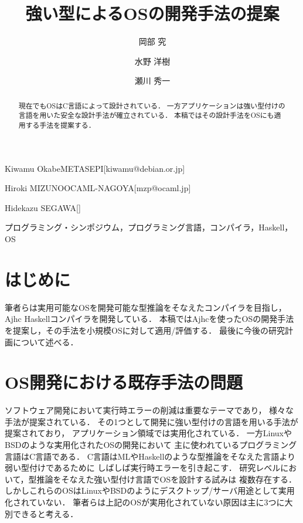 \documentclass[submit,techreq,noauthor]{ipsj}
\begin{document}
\title{強い型によるOSの開発手法の提案}


\author{岡部 究}{Kiwamu Okabe}{METASEPI}[kiwamu@debian.or.jp]
\author{水野 洋樹}{Hiroki MIZUNO}{OCAML-NAGOYA}[mzp@ocaml.jp]
\author{瀬川 秀一}{Hidekazu SEGAWA}{}[]

\begin{abstract}
現在でもOSはC言語によって設計されている．
一方アプリケーションは強い型付けの言語を用いた安全な設計手法が確立されている．
本稿ではその設計手法をOSにも適用する手法を提案する．
\end{abstract}

\begin{jkeyword}
プログラミング・シンポジウム，プログラミング言語，コンパイラ，Haskell，OS
\end{jkeyword}

\maketitle

\section{はじめに}

筆者らは実用可能なOSを開発可能な型推論をそなえたコンパイラを目指し，
Ajhc Haskellコンパイラ\cite{ajhc}を開発している．
本稿ではAjhcを使ったOSの開発手法を提案し，その手法を小規模OSに対して適用/評価する．
最後に今後の研究計画について述べる．

\section{OS開発における既存手法の問題}
\label{sec:problems}

ソフトウェア開発において実行時エラーの削減は重要なテーマであり，
様々な手法が提案されている．
その1つとして開発に強い型付けの言語を用いる手法が提案されており，
アプリケーション領域では実用化されている．
一方LinuxやBSDのような実用化されたOSの開発において
主に使われているプログラミング言語はC言語である．
C言語はMLやHaskellのような型推論をそなえた言語より弱い型付けであるために
しばしば実行時エラーを引き起こす．
研究レベルにおいて，型推論をそなえた強い型付け言語でOSを設計する試みは
複数存在する\cite{snowflake-os}\cite{house}．
しかしこれらのOSはLinuxやBSDのようにデスクトップ/サーバ用途として実用化されていない．
筆者らは上記のOSが実用化されていない原因は主に3つに大別できると考える．
\end{document}
